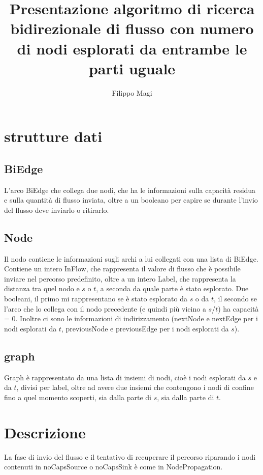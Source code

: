 \documentclass{article}
\title{Presentazione algoritmo di ricerca bidirezionale di flusso con numero di nodi esplorati da entrambe le parti uguale}
\author{Filippo Magi }
\begin{document}
\maketitle

\section{strutture dati}
\subsection{BiEdge}

L'arco BiEdge che collega due nodi, che ha le informazioni sulla capacità residua e sulla quantità di flusso inviata, oltre a un booleano per capire se durante l'invio del flusso deve inviarlo o ritirarlo.

\subsection{Node}

Il nodo contiene le informazioni sugli archi a lui collegati con una lista di BiEdge.
Contiene un intero InFlow, che rappresenta il valore di flusso che è possibile inviare nel percorso predefinito, oltre a un intero Label, che rappresenta la distanza tra quel nodo e $s$ o $t$, a seconda da quale parte è stato esplorato.
Due booleani, il primo mi rappresentano se è stato esplorato da $s$ o da $t$, il secondo se l'arco che lo collega con il nodo precedente (e quindi più vicino a $s$/$t$) ha capacità =  0.
Inoltre ci sono le informazioni di indirizzamento (nextNode e nextEdge per i nodi esplorati da $t$, previousNode e previousEdge per i nodi esplorati da $s$).
\subsection{graph}
Graph è rappresentato da una lista di insiemi di nodi, cioè i nodi esplorati da $s$ e da $t$, divisi per label, oltre ad avere due insiemi che contengono i nodi di confine fino a quel momento scoperti, sia dalla parte di $s$, sia dalla parte di $t$.

\section{Descrizione}

La fase di invio del flusso e il tentativo di recuperare il percorso riparando i nodi contenuti in noCapsSource o noCapsSink è come in NodePropagation. %
\end{document}
